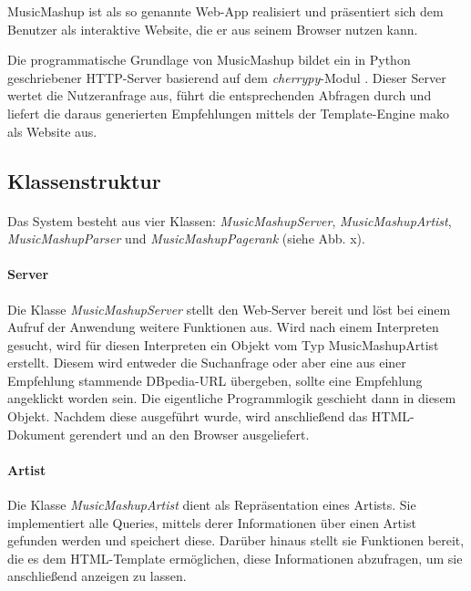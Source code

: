MusicMashup ist als so genannte Web-App realisiert und präsentiert sich dem Benutzer als interaktive Website, die er aus seinem Browser nutzen kann.

Die programmatische Grundlage von MusicMashup bildet ein in Python geschriebener 
HTTP-Server basierend auf dem \textit{cherrypy}-Modul \cite{cherrypy}. Dieser Server wertet die Nutzeranfrage aus, führt die entsprechenden Abfragen durch und liefert die daraus generierten Empfehlungen mittels der Template-Engine mako \cite{mako} als Website aus. 

\subsection{Klassenstruktur}


\paragraph{}Das System besteht aus vier Klassen: \textit{MusicMashupServer}, \textit{MusicMashupArtist}, \textit{MusicMashupParser} und \textit{MusicMashupPagerank} (siehe Abb. x).



\paragraph{Server} Die Klasse \textit{MusicMashupServer} stellt den Web-Server bereit und löst bei einem Aufruf der Anwendung weitere Funktionen aus. Wird nach einem Interpreten gesucht, wird für diesen Interpreten ein Objekt vom Typ MusicMashupArtist erstellt. Diesem wird entweder die Suchanfrage oder aber eine aus einer Empfehlung stammende DBpedia-URL übergeben, sollte eine Empfehlung angeklickt worden sein. Die eigentliche Programmlogik geschieht dann in diesem Objekt. Nachdem diese ausgeführt wurde, wird anschließend das HTML-Dokument gerendert und an den Browser ausgeliefert.


\paragraph{Artist} Die Klasse \textit{MusicMashupArtist} dient als Repräsentation eines Artists. Sie implementiert alle Queries, mittels derer Informationen über einen Artist gefunden werden und speichert diese. Darüber hinaus stellt sie Funktionen bereit, die es dem HTML-Template ermöglichen, diese Informationen abzufragen, um sie anschließend anzeigen zu lassen.


